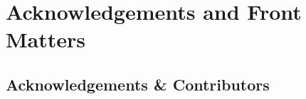 \documentclass[11pt,fleqn, openany]{book} %
\begin{document}
\frontmatter
%

%


\part{Acknowledgements and Front Matters}





\linespread{1.15} %

\chapter{Acknowledgements \& Contributors}\label{sec:acknowledgements}




\pagestyle{empty} %

\tableofcontents %

\cleardoublepage %

\pagestyle{fancy} %

\pagebreak
\end{document}
